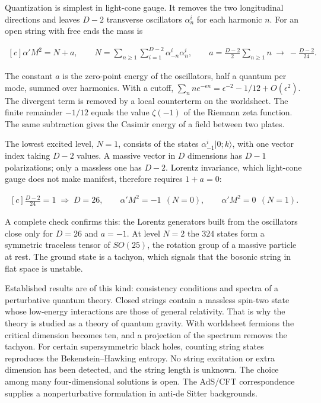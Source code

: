 \documentclass[11pt,oneside]{book}
\newenvironment{centeredalign}{\[\begin{gathered}[c]}{\end{gathered}\]}
\begin{document}
Quantization is simplest in light-cone gauge. It removes the two longitudinal directions and leaves \(D-2\) transverse oscillators \(\alpha^i_n\) for each harmonic \(n\). For an open string with free ends the mass is

\begin{centeredalign}
\alpha'M^2=N+a,\qquad
N=\sum_{n\geq1}\sum_{i=1}^{D-2}\alpha^i_{-n}\alpha^i_n,\qquad
a=\frac{D-2}{2}\sum_{n\geq1}n\ \to\ -\frac{D-2}{24}.
\end{centeredalign}

The constant \(a\) is the zero-point energy of the oscillators, half a quantum per mode, summed over harmonics. With a cutoff, \(\sum_nne^{-\epsilon n}=\epsilon^{-2}-1/12+O(\epsilon^2)\). The divergent term is removed by a local counterterm on the worldsheet. The finite remainder \(-1/12\) equals the value \(\zeta(-1)\) of the Riemann zeta function. The same subtraction gives the Casimir energy of a field between two plates.

The lowest excited level, \(N=1\), consists of the states \(\alpha^i_{-1}|0;k\rangle\), with one vector index taking \(D-2\) values. A massive vector in \(D\) dimensions has \(D-1\) polarizations; only a massless one has \(D-2\). Lorentz invariance, which light-cone gauge does not make manifest, therefore requires \(1+a=0\):

\begin{centeredalign}
\frac{D-2}{24}=1\;\Rightarrow\;D=26,\qquad
\alpha'M^2=-1\ \ (N=0),\qquad \alpha'M^2=0\ \ (N=1).
\end{centeredalign}

A complete check confirms this: the Lorentz generators built from the oscillators close only for \(D=26\) and \(a=-1\). At level \(N=2\) the \(324\) states form a symmetric traceless tensor of \(SO(25)\), the rotation group of a massive particle at rest. The ground state is a tachyon, which signals that the bosonic string in flat space is unstable.

Established results are of this kind: consistency conditions and spectra of a perturbative quantum theory. Closed strings contain a massless spin-two state whose low-energy interactions are those of general relativity. That is why the theory is studied as a theory of quantum gravity. With worldsheet fermions the critical dimension becomes ten, and a projection of the spectrum removes the tachyon. For certain supersymmetric black holes, counting string states reproduces the Bekenstein--Hawking entropy. No string excitation or extra dimension has been detected, and the string length is unknown. The choice among many four-dimensional solutions is open. The AdS/CFT correspondence supplies a nonperturbative formulation in anti-de Sitter backgrounds.
\end{document}
